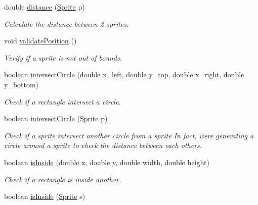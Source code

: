 \begin{DoxyCompactItemize}
double \mbox{\hyperlink{classfr_1_1groupe40_1_1projet_1_1model_1_1_sprite_af42e0eb11d2408ca1f4bbb17164e3b24}{distance}} (\mbox{\hyperlink{classfr_1_1groupe40_1_1projet_1_1model_1_1_sprite}{Sprite}} p)
\begin{DoxyCompactList}\small\item\em Calculate the distance between 2 sprites. \end{DoxyCompactList}\item 
\mbox{\label{classfr_1_1groupe40_1_1projet_1_1model_1_1_sprite_a38a7ee4fb45129e891b8a78a120ffe94}} 
void \mbox{\hyperlink{classfr_1_1groupe40_1_1projet_1_1model_1_1_sprite_a38a7ee4fb45129e891b8a78a120ffe94}{validate\+Position}} ()
\begin{DoxyCompactList}\small\item\em Verify if a sprite is not out of bounds. \end{DoxyCompactList}\item 
boolean \mbox{\hyperlink{classfr_1_1groupe40_1_1projet_1_1model_1_1_sprite_a2a5da521a659f398efee6f2b0a45aa51}{intersect\+Circle}} (double x\+\_\+left, double y\+\_\+top, double x\+\_\+right, double y\+\_\+bottom)
\begin{DoxyCompactList}\small\item\em Check if a rectangle intersect a circle. \end{DoxyCompactList}\item 
boolean \mbox{\hyperlink{classfr_1_1groupe40_1_1projet_1_1model_1_1_sprite_a87346b18a5d8370e1f0634011698675b}{intersect\+Circle}} (\mbox{\hyperlink{classfr_1_1groupe40_1_1projet_1_1model_1_1_sprite}{Sprite}} p)
\begin{DoxyCompactList}\small\item\em Check if a sprite intersect another circle from a sprite In fact, we\textquotesingle{}re generating a circle around a sprite to check the distance between each others. \end{DoxyCompactList}\item 
boolean \mbox{\hyperlink{classfr_1_1groupe40_1_1projet_1_1model_1_1_sprite_a7c826b664373d244725751f74c057b12}{is\+Inside}} (double x, double y, double width, double height)
\begin{DoxyCompactList}\small\item\em Check if a rectangle is inside another. \end{DoxyCompactList}\item 
boolean \mbox{\hyperlink{classfr_1_1groupe40_1_1projet_1_1model_1_1_sprite_a2c39c997fa632f4d90807fdaa3a4a9b4}{is\+Inside}} (\mbox{\hyperlink{classfr_1_1groupe40_1_1projet_1_1model_1_1_sprite}{Sprite}} s)

\end{DoxyCompactItemize}
